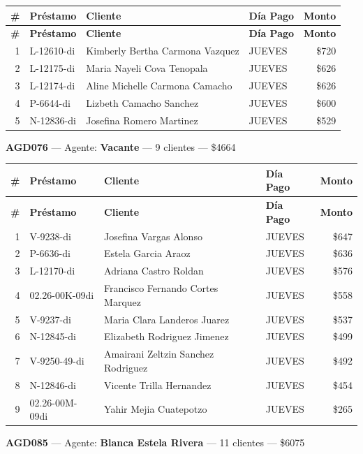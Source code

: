 \documentclass[11pt,a4paper]{article}
\newcommand{\money}[1]{\$\num{#1}}
\begin{document}
\begin{center}
\renewcommand{\arraystretch}{1.1}
\footnotesize
\begin{longtable}{rlp{6.5cm}lr}
\toprule
\textbf{\#} & \textbf{Pr\'estamo} & \textbf{Cliente} & \textbf{D\'ia Pago} & \textbf{Monto} \\
\midrule
\endfirsthead
\toprule
\textbf{\#} & \textbf{Pr\'estamo} & \textbf{Cliente} & \textbf{D\'ia Pago} & \textbf{Monto} \\
\midrule
\endhead
1 & L-12610-di & Kimberly Bertha Carmona Vazquez & JUEVES & \money{720} \\
2 & L-12175-di & Maria Nayeli Cova Tenopala & JUEVES & \money{626} \\
3 & L-12174-di & Aline Michelle Carmona Camacho & JUEVES & \money{626} \\
4 & P-6644-di & Lizbeth Camacho Sanchez & JUEVES & \money{600} \\
5 & N-12836-di & Josefina Romero Martinez & JUEVES & \money{529} \\

\bottomrule
\end{longtable}
\end{center}
\noindent\textbf{AGD076} --- Agente: \textbf{Vacante} --- 9 clientes --- \money{4664}


\begin{center}
\renewcommand{\arraystretch}{1.1}
\footnotesize
\begin{longtable}{rlp{6.5cm}lr}
\toprule
\textbf{\#} & \textbf{Pr\'estamo} & \textbf{Cliente} & \textbf{D\'ia Pago} & \textbf{Monto} \\
\midrule
\endfirsthead
\toprule
\textbf{\#} & \textbf{Pr\'estamo} & \textbf{Cliente} & \textbf{D\'ia Pago} & \textbf{Monto} \\
\midrule
\endhead
1 & V-9238-di & Josefina Vargas Alonso & JUEVES & \money{647} \\
2 & P-6636-di & Estela Garcia Araoz & JUEVES & \money{636} \\
3 & L-12170-di & Adriana Castro Roldan & JUEVES & \money{576} \\
4 & 02.26-00K-09di & Francisco Fernando Cortes Marquez & JUEVES & \money{558} \\
5 & V-9237-di & Maria Clara Landeros Juarez & JUEVES & \money{537} \\
6 & N-12845-di & Elizabeth Rodriguez Jimenez & JUEVES & \money{499} \\
7 & V-9250-49-di & Amairani Zeltzin Sanchez Rodriguez & JUEVES & \money{492} \\
8 & N-12846-di & Vicente Trilla Hernandez & JUEVES & \money{454} \\
9 & 02.26-00M-09di & Yahir Mejia Cuatepotzo & JUEVES & \money{265} \\

\bottomrule
\end{longtable}
\end{center}
\noindent\textbf{AGD085} --- Agente: \textbf{Blanca Estela Rivera} --- 11 clientes --- \money{6075}
\end{document}
